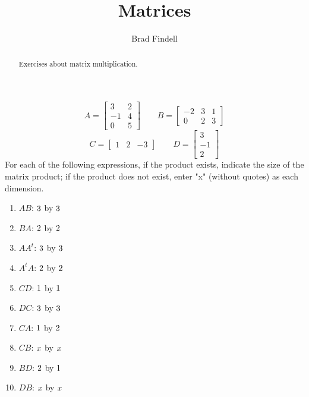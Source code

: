 \documentclass[handout]{ximera}
\title{Matrices}
\author{Brad Findell}
\begin{document}
\begin{abstract}
Exercises about matrix multiplication.  
\end{abstract}
\maketitle

\begin{exercise}

\[
A = \begin{bmatrix}  3   &  2\\   -1  &  4\\   0   &  5 \end{bmatrix} \qquad
B = \begin{bmatrix}   -2  &  3  &  1\\  0  &  2  &  3 \end{bmatrix}
\]
\[
C = \begin{bmatrix}  1  &   2 &   -3\end{bmatrix} \qquad
D = \begin{bmatrix} 3\\  -1\\ 2  \end{bmatrix}
\]
For each of the following expressions, if the product exists, indicate the size of the matrix product; if the product does not exist, enter "x" (without quotes) as each dimension. 
\begin{enumerate}
\item $AB$: ${3}$ by ${3}$
\item $BA$: ${2}$ by ${2}$
\item $AA^t$: ${3}$ by ${3}$
\item $A^tA$: ${2}$ by ${2}$
\item $CD$: ${1}$ by ${1}$
\item $DC$: ${3}$ by ${3}$
\item $CA$: ${1}$ by ${2}$
\item $CB$: ${x}$ by ${x}$
\item $BD$: ${2}$ by ${1}$
\item $DB$: ${x}$ by ${x}$ 
\end{enumerate}


\end{exercise}
\end{document}

